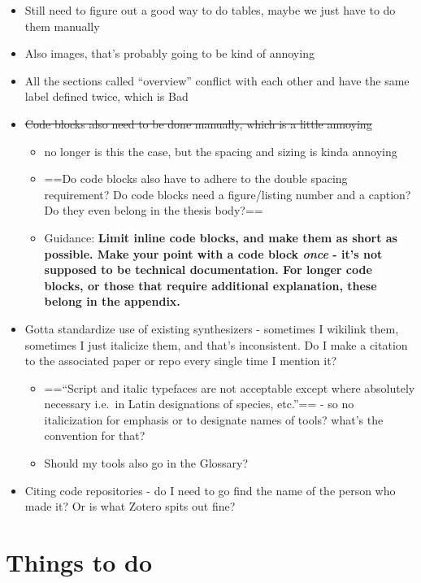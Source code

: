 \begin{itemize}
\tightlist
\item
  Still need to figure out a good way to do tables, maybe we just have
  to do them manually
\item
  Also images, that's probably going to be kind of annoying
\item
  All the sections called ``overview'' conflict with each other and have
  the same label defined twice, which is Bad
\item
  \st{Code blocks also need to be done manually, which is a little
  annoying}

  \begin{itemize}
  \tightlist
  \item
    no longer is this the case, but the spacing and sizing is kinda
    annoying
  \item
    ==Do code blocks also have to adhere to the double spacing
    requirement? Do code blocks need a figure/listing number and a
    caption? Do they even belong in the thesis body?==
  \item
    Guidance: \textbf{Limit inline code blocks, and make them as short
    as possible. Make your point with a code block \emph{once} - it's
    not supposed to be technical documentation. For longer code blocks,
    or those that require additional explanation, these belong in the
    appendix.}
  \end{itemize}
\item
  Gotta standardize use of existing synthesizers - sometimes I wikilink
  them, sometimes I just italicize them, and that's inconsistent. Do I
  make a citation to the associated paper or repo every single time I
  mention it?

  \begin{itemize}
  \tightlist
  \item
    ==``Script and italic typefaces are not acceptable except where
    absolutely necessary i.e.~in Latin designations of species, etc.''==
    - so no italicization for emphasis or to designate names of tools?
    what's the convention for that?
  \item
    Should my tools also go in the Glossary?
  \end{itemize}
\item
  Citing code repositories - do I need to go find the name of the person
  who made it? Or is what Zotero spits out fine?
\end{itemize}

\section{Things to do}\label{things-to-do}

